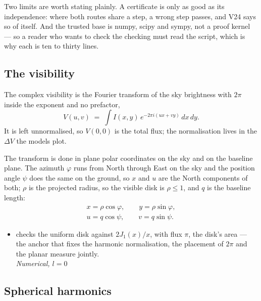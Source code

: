Two limits are worth stating plainly.  A certificate is only as good as its independence: where
both routes share a step, a wrong step passes, and V24 says so of itself.  And the trusted base
is numpy, scipy and sympy, not a proof kernel --- so a reader who wants to check the checking
must read the script, which is why each is ten to thirty lines.

\subsection{The visibility}

The complex visibility is the Fourier transform of the sky brightness with $2\pi$ inside the
exponent and no prefactor,
\begin{equation}
  V(u,v) \;=\; \int I(x,y)\, e^{-2\pi i (u x + v y)}\, dx\, dy .
  \label{eq:brief-visibility}
\end{equation}
It is left unnormalised, so $V(0,0)$ is the total flux; the normalisation lives in the
$\Delta V$ the models plot.

The transform is done in plane polar coordinates on the sky and on the baseline plane.  The
azimuth $\varphi$ runs from North through East on the sky and the position angle $\psi$ does the
same on the ground, so $x$ and $u$ are the North components of both; $\rho$ is the projected
radius, so the visible disk is $\rho \le 1$, and $q$ is the baseline length:
\begin{align}
  x = \rho\cos\varphi , \qquad y = \rho\sin\varphi ,
    \label{eq:brief-sky-polar} \\
  u = q\cos\psi , \qquad v = q\sin\psi .
    \label{eq:brief-baseline-polar}
\end{align}

\begin{itemize}
  \item[$\checkmark$]  checks the uniform disk against
    $2J_1(x)/x$, with flux $\pi$, the disk's area --- the anchor that fixes the harmonic
    normalisation, the placement of $2\pi$ and the planar measure jointly.
    \\[1pt] \quad \emph{Numerical, $l = 0$}
\end{itemize}

\subsection{Spherical harmonics}

